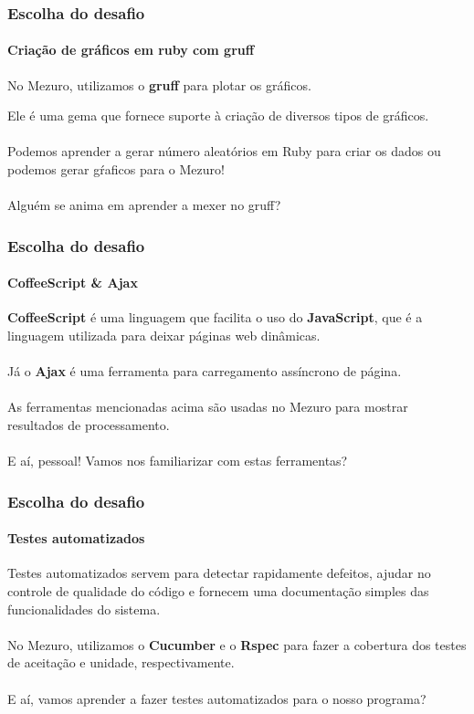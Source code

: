 \documentclass{beamer}
\begin{document}
\begin{frame}
	\frametitle{Escolha do desafio}
  \framesubtitle{Criação de gráficos em ruby com gruff}
  
  No Mezuro, utilizamos o \textbf{gruff} para plotar os gráficos.
  
  Ele é uma gema que fornece suporte à criação de diversos tipos de gráficos. \\~\\
  Podemos aprender a gerar número aleatórios em Ruby para criar os dados ou podemos gerar gŕaficos para o Mezuro! \\~\\
  
  Alguém se anima em aprender a mexer no gruff?
\end{frame}

\begin{frame}
	\frametitle{Escolha do desafio}
  \framesubtitle{CoffeeScript \& Ajax}
  
  \textbf{CoffeeScript} é uma linguagem que facilita o uso do \textbf{JavaScript}, que é a linguagem utilizada para deixar páginas web dinâmicas. \\~\\
  Já o \textbf{Ajax} é uma ferramenta para carregamento assíncrono de página. \\~\\
  As ferramentas mencionadas acima são usadas no Mezuro para mostrar resultados de processamento. \\~\\
  
  E aí, pessoal! Vamos nos familiarizar com estas ferramentas?
\end{frame}

\begin{frame}
	\frametitle{Escolha do desafio}
  \framesubtitle{Testes automatizados}
  
  Testes automatizados servem para detectar  rapidamente  defeitos,  ajudar  no  controle de  qualidade  do  código  e  fornecem   uma  documentação  simples  das  funcionalidades  do sistema. \\~\\
  No Mezuro, utilizamos o \textbf{Cucumber} e o \textbf{Rspec} para fazer a cobertura dos testes de aceitação e unidade, respectivamente. \\~\\
  
  E aí, vamos aprender a fazer testes automatizados para o nosso programa?
 

\end{frame}
\end{document}
